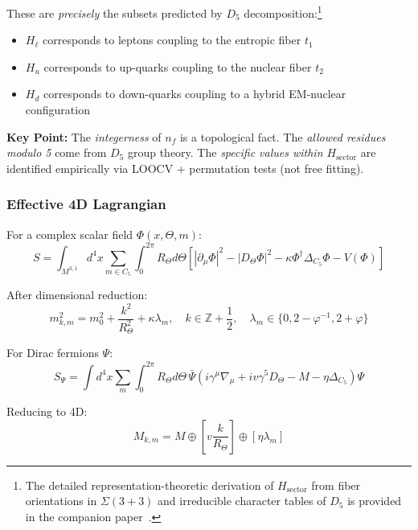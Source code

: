\documentclass[12pt]{article}
\begin{document}
These are \emph{precisely} the subsets predicted by $D_5$ decomposition:\footnote{The detailed representation-theoretic derivation of $H_{\text{sector}}$ from fiber orientations in $\Sigma(3+3)$ and irreducible character tables of $D_5$ is provided in the companion paper~\cite{camargo2025sigmamoebius}.}
\begin{itemize}
\item $H_\ell$ corresponds to leptons coupling to the entropic fiber $t_1$
\item $H_u$ corresponds to up-quarks coupling to the nuclear fiber $t_2$
\item $H_d$ corresponds to down-quarks coupling to a hybrid EM-nuclear configuration
\end{itemize}

\textbf{Key Point:} The \emph{integerness} of $n_f$ is a topological fact. The \emph{allowed residues modulo 5} come from $D_5$ group theory. The \emph{specific values within $H_{\text{sector}}$} are identified empirically via LOOCV + permutation tests (not free fitting).

\subsubsection{Effective 4D Lagrangian}

For a complex scalar field $\Phi(x, \Theta, m)$:
\begin{equation}
S = \int_{M^{3,1}} d^4x \sum_{m \in C_5} \int_0^{2\pi} R_\Theta d\Theta \left[ |\partial_\mu \Phi|^2 - |D_\Theta \Phi|^2 - \kappa \Phi^\dagger \Delta_{C_5} \Phi - V(\Phi) \right]
\end{equation}

After dimensional reduction:
\begin{equation}
\boxed{m_{k,m}^2 = m_0^2 + \frac{k^2}{R_\Theta^2} + \kappa \lambda_m}, \quad k \in \mathbb{Z} + \frac{1}{2}, \quad \lambda_m \in \{0, 2-\varphi^{-1}, 2+\varphi\}
\end{equation}

For Dirac fermions $\Psi$:
\begin{equation}
S_\Psi = \int d^4x \sum_m \int_0^{2\pi} R_\Theta d\Theta \, \bar{\Psi} \left( i\gamma^\mu \nabla_\mu + iv\gamma^5 D_\Theta - M - \eta \Delta_{C_5} \right) \Psi
\end{equation}

Reducing to 4D:
\begin{equation}
M_{k,m} = M \oplus \left[ v \frac{k}{R_\Theta} \right] \oplus \left[ \eta \lambda_m \right]
\end{equation}
\end{document}

